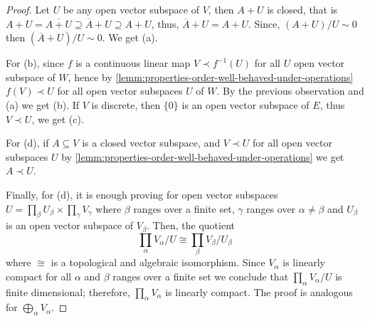 \begin{proof}
	Let $U$ be any open vector subspace of $V$, then $A + U$ is closed, that is $A + U = \overline{A + U} \supseteq \overline{A} + U \supseteq A + U$, thus, $\overline{A} + U = A + U$. Since, $(A + U)/U \sim 0$ then $(\overline{A} + U)/U \sim 0$. We get (a). 

	For (b), since $f$ is a continuous linear map $V \prec f^{-1}(U)$ for all $U$ open vector subspace of $W$, hence by \cref{lemm:properties-order-well-behaved-under-operations} $f(V) \prec U$ for all open vector subspaces $U$ of $W$. By the previous observation and (a) we get (b). If $V$ is discrete, then $\{0\}$ is an open vector subspace of $E$, thus $V \prec U$, we get (c). 

	For (d), if $A \subseteq V$ is a closed vector subspace, and $V \prec U$ for all open vector subspaces $U$ by \cref{lemm:properties-order-well-behaved-under-operations} we get $A \prec U$. 

	Finally, for (d), it is enough proving for open vector subspaces $U = \prod_{\beta} U_{\beta} \times \prod_{\gamma} V_{\gamma}$ where $\beta$ ranges over a finite set, $\gamma$ ranges over $\alpha \neq \beta$ and $U_{\beta}$ is an open vector subspace of $V_{\beta}$. Then, the quotient
	\[
		\prod_{\alpha}V_{\alpha} / U \cong \prod_{\beta} V_{\beta}/U_{\beta}
	\]
	where $\cong$ is a topological and algebraic isomorphism. Since $V_{\alpha}$ is linearly compact for all $\alpha$ and $\beta$ ranges over a finite set we conclude that $\prod_{\alpha} V_{\alpha} / U$ is finite dimensional; therefore, $\prod_{\alpha} V_{\alpha}$ is linearly compact. The proof is analogous for $\bigoplus_{\alpha} V_{\alpha}$.
\end{proof} 
